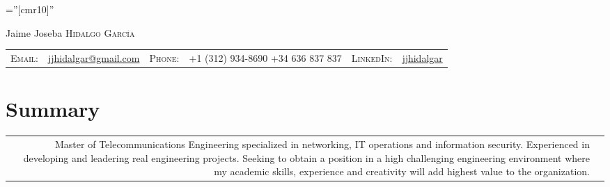 \documentclass[a4paper,10pt]{article}
\begin{document}

\pagestyle{empty} %

\font\fb=''[cmr10]'' %

\par{\centering
		{\Huge Jaime Joseba \textsc{Hidalgo García}
	}\bigskip\par}



\begin{tabular}{rp{4.0cm}rp{4.0cm}rp{4.0cm}}
    \textsc{Email:} & \href{mailto:jjhidalgar@gmail.com}{jjhidalgar@gmail.com} & 
    \textsc{Phone:\newline} & +1 (312) 934-8690 \newline +34 636 837 837  &
    \textsc{LinkedIn:} &\href{https://www.linkedin.com/in/jjhidalgar/}{jjhidalgar} 
\end{tabular}

\section{Summary}
\begin{tabular}{rp{13.6cm}}
  \begin{minipage}[t]{1\columnwidth}%
  Master of Telecommunications Engineering specialized in networking, IT operations and information security. Experienced in developing and leadering real engineering projects. Seeking to obtain a position in a high challenging engineering environment where my academic skills, experience and creativity will add highest value to the organization.
    \end{minipage}\tabularnewline
\end{tabular}
\end{document}
